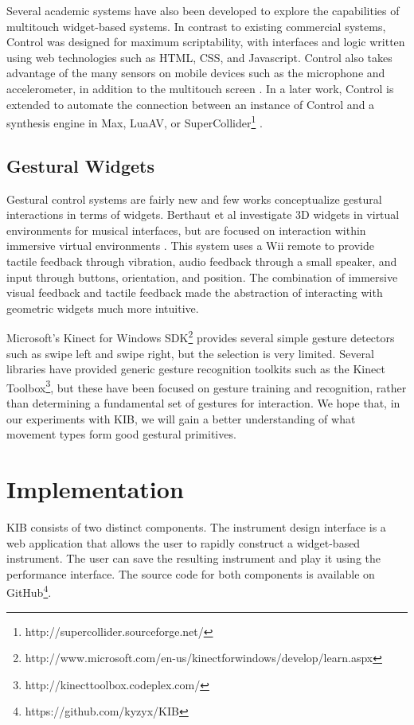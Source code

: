 \documentclass{nime-alternate}
\begin{document}
Several academic systems have also been developed to explore the capabilities of multitouch
widget-based systems. In contrast to existing commercial systems, Control was designed for maximum scriptability, with interfaces and logic written using web technologies such as HTML, CSS, and Javascript. Control also takes advantage of the many sensors on mobile devices such
as the microphone and accelerometer, in addition to the multitouch screen \cite{roberts2011control}. In a later work, Control is 
extended to automate the connection between an instance of Control and a synthesis engine in Max, LuaAV\cite{wakefield2010luaav}, or SuperCollider\footnote{http://supercollider.sourceforge.net/} \cite{roberts2012mobile}.

\subsection{Gestural Widgets}
Gestural control systems are fairly new and few works conceptualize gestural interactions in terms of widgets. Berthaut et al investigate 3D widgets in virtual environments for musical
interfaces, but are focused on interaction within immersive virtual environments \cite{berthaut2011interacting}. This system uses a Wii remote to provide tactile feedback through vibration,
audio feedback through a small speaker, and input through buttons, orientation, and position. The combination of immersive visual feedback and tactile feedback made the abstraction
of interacting with geometric widgets much more intuitive.

Microsoft's Kinect for Windows SDK\footnote{http://www.microsoft.com/en-us/kinectforwindows/develop/learn.aspx} provides several simple gesture detectors such as swipe left and
swipe right, but the selection is very limited. Several libraries have provided generic gesture recognition toolkits such as the Kinect Toolbox\footnote{http://kinecttoolbox.codeplex.com/}, but these have been focused on gesture training and recognition, rather
than determining a fundamental set of gestures for interaction. We hope that, in our
experiments with KIB, we will gain a better understanding of what movement types form good gestural primitives.
\section{Implementation}
KIB consists of two distinct components. The instrument design interface is a web
application that allows the user to rapidly construct a widget-based instrument. The user
can save the resulting instrument and play it using the performance interface. The source code
for both components is available on GitHub\footnote{https://github.com/kyzyx/KIB}.
\end{document}
